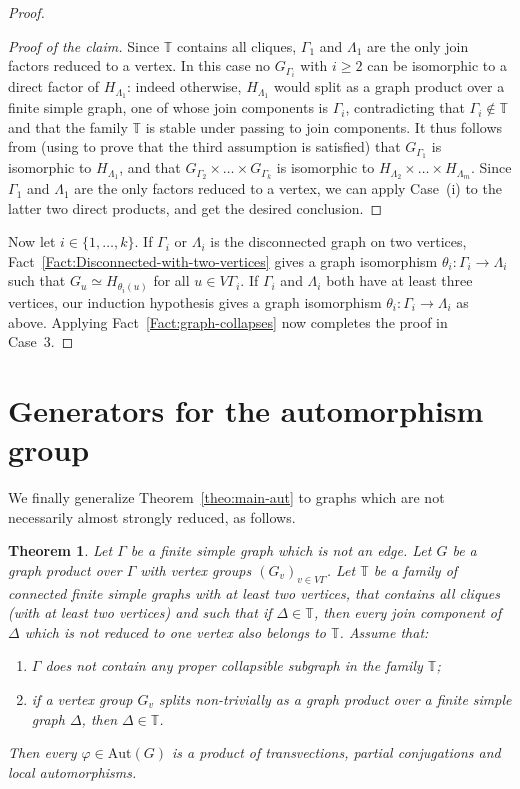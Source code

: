 \documentclass[a4paper,english,11pt]{article}
\newtheorem{theo}[de]{Theorem}
\theoremstyle{definition}
\theoremstyle{remark}
\newcommand{\Aut}{\mathrm{Aut}}
\begin{document}
\begin{proof}
\begin{proof}[Proof of the claim]
Since $\mathbb{T}$ contains all cliques,  $\Gamma_1$ and $\Lambda_1$ are the
only join factors reduced to a vertex. In this case no $G_{\Gamma_i}$ with $i\ge
2$ can be isomorphic to a direct factor of $H_{\Lambda_1}$: indeed otherwise,
$H_{\Lambda_1}$ would split as a graph product over a finite simple graph, one
of whose join components is $\Gamma_i$, contradicting that
$\Gamma_i\notin\mathbb{T}$ and that the family $\mathbb{T}$ is stable under
passing to join components.
It thus follows from \cite[Lemma~3.12]{Gen} (using \cite[Lemma~3.5]{Gen} to prove that the third assumption is satisfied) that $G_{\Gamma_1}$ is isomorphic to $H_{\Lambda_1}$, and that $G_{\Gamma_2}\times\dots\times G_{\Gamma_k}$ is isomorphic to $H_{\Lambda_2}\times\dots\times H_{\Lambda_m}$. Since $\Gamma_1$ and $\Lambda_1$ are the only factors reduced to a vertex, we can apply Case~(i) to the latter two direct products, and get the desired conclusion.
\end{proof}
 
Now let $i\in \{1,\dots,k\}$. If $\Gamma_i$ or $\Lambda_i$ is the disconnected graph on two vertices, Fact~\ref{Fact:Disconnected-with-two-vertices} gives a graph isomorphism $\theta_{i}:\Gamma_i \rightarrow \Lambda_i$ such that $G_{u}\simeq H_{\theta_{i}(u)}$ for all $u\in V\Gamma_i$. If $\Gamma_i$ and $\Lambda_i$ both have at least three vertices, our induction hypothesis gives a graph isomorphism $\theta_{i}:\Gamma_i \rightarrow \Lambda_i$ as above. Applying Fact~\ref{Fact:graph-collapses} now completes the proof in Case~3.
\end{proof}



\section{Generators for the automorphism group}\label{sec:3.2}

We finally generalize Theorem~\ref{theo:main-aut} to graphs which are not necessarily almost strongly reduced, as follows.

\begin{theo}\label{theo:aut-complete}
Let $\Gamma$ be a finite simple graph which is not an edge. Let $G$ be a graph product over $\Gamma$ with vertex groups $(G_v)_{v\in V\Gamma}$. Let $\mathbb{T}$ be a family of connected finite simple graphs with at least two vertices, that contains all cliques (with at least two vertices) and such that if $\Delta\in\mathbb{T}$, then every join component of $\Delta$ which is not reduced to one vertex also belongs to $\mathbb{T}$. Assume that: 
\begin{enumerate}
    \item\label{item:hyp1_aut_complete} $\Gamma$ does not contain any proper collapsible subgraph in the family $\mathbb{T}$;
    \item\label{item:hyp2_aut_complete} if a vertex group $G_v$ splits non-trivially as a graph product over a finite simple graph $\Delta$, then $\Delta\in\mathbb{T}$. 
\end{enumerate}
Then every $\varphi\in\Aut(G)$ is a product of transvections, partial conjugations and local automorphisms.
\end{theo}
\end{document}
